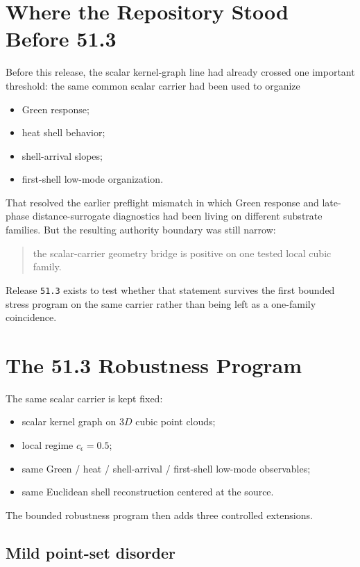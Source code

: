 \documentclass[11pt]{article}
\begin{document}
\section{Where the Repository Stood Before 51.3}

Before this release, the scalar kernel-graph line had already crossed one important threshold: the same common scalar carrier had been used to organize
\begin{itemize}
\item Green response;
\item heat shell behavior;
\item shell-arrival slopes;
\item first-shell low-mode organization.
\end{itemize}

That resolved the earlier preflight mismatch in which Green response and late-phase distance-surrogate diagnostics had been living on different substrate families. But the resulting authority boundary was still narrow:

\begin{quote}
the scalar-carrier geometry bridge is positive on one tested local cubic family.
\end{quote}

Release \texttt{51.3} exists to test whether that statement survives the first bounded stress program on the same carrier rather than being left as a one-family coincidence.

\section{The 51.3 Robustness Program}

The same scalar carrier is kept fixed:
\begin{itemize}
\item scalar kernel graph on \(3D\) cubic point clouds;
\item local regime \(c_\epsilon = 0.5\);
\item same Green / heat / shell-arrival / first-shell low-mode observables;
\item same Euclidean shell reconstruction centered at the source.
\end{itemize}

The bounded robustness program then adds three controlled extensions.

\subsection{Mild point-set disorder}
\end{document}
